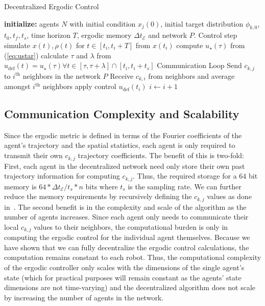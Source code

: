 \documentclass[letterpaper, 10 pt, conference]{ieeeconf}  %
\begin{document}
\begin{algorithm}
\caption{Decentralized Ergodic Control} \label{alg:decentralized-ergodic-control}
\centering
\begin{algorithmic}[1]
\State \textbf{initialize:} agents $N$ with initial condition $x_j(0)$, initial target distribution $\phi_{k,0}$, $t_0, t_f, t_s$, time horizon $T$, ergodic memory $\Delta t_\mathcal{E}$ and network $P$.
\Comment Control step
\State simulate $x(t), \rho(t)$ for $t \in \left[ t_i, t_i +T \right] $ from $x(t_i)$
\State compute $u_\star(\tau)$ from (\ref{eq:ustar})
\State calculate $\tau$ and $\lambda$ from \cite{ansari2016sequential, mavrommatiTRO2017realTime}
\State $u_\text{def}(t) = u_\star(\tau) \forall t \in \left[ \tau, \tau+\lambda \right] \cap \left[ t_i, t_i+t_s\right]$
\EndFor
{}
\Comment Communication Loop
\State Send $c_{k,j}$ to $i^\text{th}$ neighbors in the network $P$
\State Receive $c_{k,i}$ from neighbors and average amongst $i^\text{th}$ neighbors
\EndFor
\State apply control $u_\text{def}(t_i)$
\State $i \gets i +1$
\EndWhile
\end{algorithmic}
\end{algorithm}

\subsection{Communication Complexity and Scalability}
Since the ergodic metric is defined in terms of the Fourier coefficients of the agent's trajectory and the spatial statistics, each agent is only required to transmit their own $c_{k,j}$ trajectory coefficients.
The benefit of this is two-fold: First, each agent in the decentralized network need only store their own past trajectory information for computing $c_{k,j}$.
Thus, the required storage for a $64$ bit memory is $64 * \Delta t_\mathcal{E}/ t_s * n$ bits where $t_s$ is the sampling rate.
We can further reduce the memory requirements by recursively defining the $c_{k,j}$ values as done in~\cite{mavrommatiTRO2017realTime}.
The second benefit is in the complexity and scale of the algorithm as the number of agents increases.
Since each agent only needs to communicate their local $c_{k,j}$ values to their neighbors, the computational burden is only in computing the ergodic control for the individual agent themselves. 
Because we have shown that we can fully decentralize the ergodic control calculations, the computation remains constant to each robot.
Thus, the computational complexity of the ergodic controller only scales with the dimensions of the single agent's state (which for practical purposes will remain constant as the agents' state dimensions are not time-varying) and the decentralized algorithm does not scale by increasing the number of agents in the network.
\end{document}
